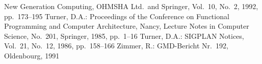 {\begin{thebibliography}{AAAA}
New Generation Computing, OHMSHA Ltd.\ and Springer,
Vol.~10, No.~2, 1992,
pp.~173--195
%
Turner, D.A.:
\bmt
{}
\amt
Proceedings of the Conference on
Functional Programming and Computer Architecture, Nancy,
Lecture Notes in Computer Science, No.~201, Springer, 1985,
pp.~1--16
%
Turner, D.A.:
\bmt
{}
\amt
SIGPLAN Notices, Vol.~21, No.~12, 1986,
pp.~158--166
%
Zimmer, R.:
\bmt
{}
\amt
GMD-Bericht Nr.~192, Oldenbourg, 1991
%
\end{thebibliography}
}
